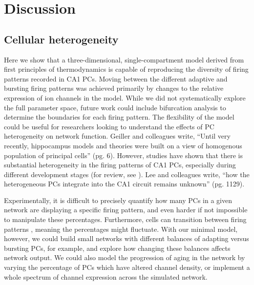 \documentclass[12pt]{article}
\begin{document}
\section{Discussion}

\subsection{Cellular heterogeneity}

Here we show that a three-dimensional, single-compartment model derived from first principles of thermodynamics is capable of reproducing the diversity of firing patterns recorded in CA1 PCs. Moving between the different adaptive and bursting firing patterns was achieved primarily by changes to the relative expression of ion channels in the model. While we did not systematically explore the full parameter space, future work could include bifurcation analysis to determine the boundaries for each firing pattern. 
The flexibility of the model could be useful for researchers looking to understand the effects of PC heterogeneity on network function. Geiller and colleagues \citep{geiller2017segregated} write, ``Until very recently, hippocampus models and theories were built on a view of homogenous population of principal cells'' (pg. 6). However, studies have shown that there is substantial heterogeneity in the firing patterns of CA1 PCs, especially during different development stages (for review, see \cite{mckiernan2017ca1}). Lee and colleagues \citep{lee2014parvalbumin} write, ``how the heterogeneous PCs integrate into the CA1 circuit remains unknown'' (pg. 1129). 

Experimentally, it is difficult to precisely quantify how many PCs in a given network are displaying a specific firing pattern, and even harder if not impossible to manipulate these percentages. Furthermore, cells can transition between firing patterns \citep{steriade1998dynamic}, meaning the percentages might fluctuate. With our minimal model, however, we could build small networks with different balances of adapting versus bursting PCs, for example, and explore how changing these balances affects network output.
We could also model the progression of aging in the network by varying the percentage of PCs which have altered {\Ca} channel density, or implement a whole spectrum of channel expression across the simulated network.
\end{document}
